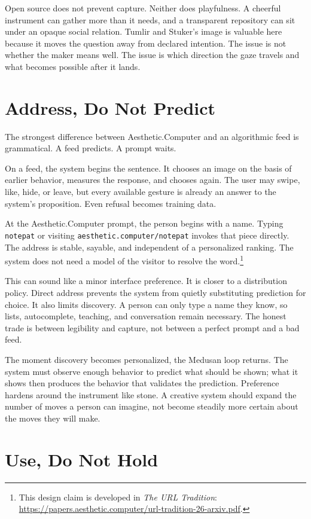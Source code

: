 \documentclass[11pt,letterpaper]{article}
\newcommand{\ac}{Aesthetic\textcolor{acpink}{.}Computer}
\begin{document}
Open source does not prevent capture. Neither does playfulness. A cheerful
instrument can gather more than it needs, and a transparent repository can sit
under an opaque social relation. Tumlir and Stuker's image is valuable here
because it moves the question away from declared intention. The issue is not
whether the maker means well. The issue is which direction the gaze travels and
what becomes possible after it lands.

\section{Address, Do Not Predict}

The strongest difference between \ac{} and an algorithmic feed is grammatical.
A feed predicts. A prompt waits.

On a feed, the system begins the sentence. It chooses an image on the basis of
earlier behavior, measures the response, and chooses again. The user may swipe,
like, hide, or leave, but every available gesture is already an answer to the
system's proposition. Even refusal becomes training data.

At the \ac{} prompt, the person begins with a name. Typing \texttt{notepat} or
visiting \texttt{aesthetic.computer/notepat} invokes that piece directly. The
address is stable, sayable, and independent of a personalized ranking. The
system does not need a model of the visitor to resolve the word.\footnote{This
design claim is developed in \textit{The URL Tradition}:
\url{https://papers.aesthetic.computer/url-tradition-26-arxiv.pdf}.}

This can sound like a minor interface preference. It is closer to a distribution
policy. Direct address prevents the system from quietly substituting prediction
for choice. It also limits discovery. A person can only type a name they know,
so lists, autocomplete, teaching, and conversation remain necessary. The honest
trade is between legibility and capture, not between a perfect prompt and a bad
feed.

The moment discovery becomes personalized, the Medusan loop returns. The system
must observe enough behavior to predict what should be shown; what it shows then
produces the behavior that validates the prediction. Preference hardens around
the instrument like stone. A creative system should expand the number of moves
a person can imagine, not become steadily more certain about the moves they will
make.

\section{Use, Do Not Hold}
\end{document}
